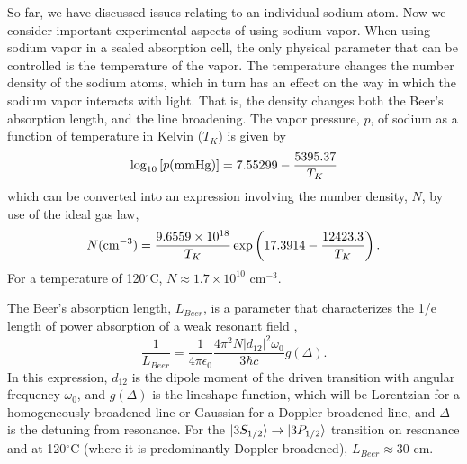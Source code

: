 So far, we have discussed issues relating to an individual sodium atom.  Now
we consider important experimental aspects of using sodium vapor.  When
using sodium vapor in a sealed absorption cell, the only physical parameter that
can be controlled is the temperature of the vapor.  The temperature changes the
number density of the sodium atoms, which in turn has an effect on
the way in which the sodium vapor interacts with light.  That is, the density
changes both the Beer's absorption length, and the line broadening.  
The vapor pressure, $p$, of sodium as a function of temperature in Kelvin
($T_K$) is given by \cite{CRC_book}
\begin{equation}
\log_{10}\left[p({\rm mmHg})\right] = 7.55299 - \frac{5395.37}{T_K}
\end{equation}
which can be converted into an expression involving the number density, $N$, by
use of the ideal gas law,
\begin{equation}
N({\rm cm}^{-3}) = \frac{9.6559 \times 10^{18}}{T_K} \exp\left(17.3914 -
\frac{12423.3}{T_K}\right).
\end{equation}
For a temperature of 120$^{\circ}$C, $N \approx 1.7 \times 10^{10}$ cm$^{-3}$.

The Beer's absorption length, $L_{Beer}$, is a parameter that characterizes the
1/e length of power absorption of a weak resonant field \cite{Allen:87},
\begin{equation}
\frac{1}{L_{Beer}} = \frac{1}{4\pi\epsilon_0}\frac{4 \pi^2 N |d_{12}|^2
\omega_0}{3 \hbar c} g(\Delta).
\end{equation}
In this expression, $d_{12}$ is the dipole moment of the driven transition with
angular frequency $\omega_0$, and $g(\Delta)$ is the lineshape function, which
will be Lorentzian for a homogeneously broadened line or Gaussian for a Doppler
broadened line, and $\Delta$ is the detuning from resonance.  For the
$\vert 3S_{1/2} \rangle\rightarrow\vert 3P_{1/2} \rangle$ transition on resonance and at
120$^{\circ}$C (where it is predominantly Doppler broadened), $L_{Beer}
\approx 30$ cm.

